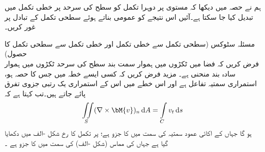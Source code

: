 ہم نے حصہ  میں دیکھا کہ مستوی پر دوہرا تکمل کو سطح کی سرحد پر خطی تکمل میں تبدیل کیا جا سکتا ہے۔آئیں اس نتیجے کو عمومی بناتے ہوئے سطحی تکمل کے تبادل پر غور کریں۔

\quad مسئلہ سٹوکس (سطحی تکمل سے خطی تکمل اور خطی تکمل سے سطحی تکمل کا حصول)\\
فرض کریں کہ فضا میں ٹکڑوں میں ہموار سمت بند سطح  کی سرحد  ٹکڑوں میں ہموار سادہ بند منحنی  ہے۔ مزید فرض کریں کہ کسی ایسے خطہ میں جس کا  حصہ ہو،  استمراری سمتیہ  تفاعل ہے اور اس خطے میں اس  کے استمراری یک رتبی جزوی تفرق پائے جاتے ہیں۔تب  کہتا ہے کہ
\begin{align}\label{مساوات_خطی_تکمل_سٹوکس_الف}
\iint\limits_S (\nabla \times \bM{v})_n \dif A=\int\limits_C v_t \dif s
\end{align}
ہو گا جہاں  کے اکائی عمود سمتیہ  کی سمت میں  کا جزو  ہے؛  پر تکمل کا رخ شکل -الف میں دکھایا گیا ہے جہاں  کی مماس  (شکل -الف) کی سمت میں   کا جزو  ہے ۔
